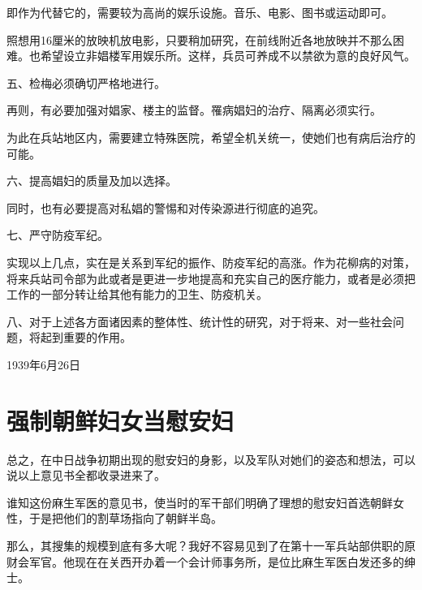 \documentclass[12pt,UTF8]{ctexbook}
\begin{document}
即作为代替它的，需要较为高尚的娱乐设施。音乐、电影、图书或运动即可。



照想用16厘米的放映机放电影，只要稍加研究，在前线附近各地放映并不那么困难。也希望设立非娼楼军用娱乐所。这样，兵员可养成不以禁欲为意的良好风气。



五、检梅必须确切严格地进行。



再则，有必要加强对娼家、楼主的监督。罹病娼妇的治疗、隔离必须实行。



为此在兵站地区内，需要建立特殊医院，希望全机关统一，使她们也有病后治疗的可能。





六、提高娼妇的质量及加以选择。



同时，也有必要提高对私娼的警惕和对传染源进行彻底的追究。



七、严守防疫军纪。



实现以上几点，实在是关系到军纪的振作、防疫军纪的高涨。作为花柳病的对策，将来兵站司令部为此或者是更进一步地提高和充实自己的医疗能力，或者是必须把工作的一部分转让给其他有能力的卫生、防疫机关。



八、对于上述各方面诸因素的整体性、统计性的研究，对于将来、对一些社会问题，将起到重要的作用。



1939年6月26日


\section{强制朝鲜妇女当慰安妇}



总之，在中日战争初期出现的慰安妇的身影，以及军队对她们的姿态和想法，可以说以上意见书全都收录进来了。



谁知这份麻生军医的意见书，使当时的军干部们明确了理想的慰安妇首选朝鲜女性，于是把他们的割草场指向了朝鲜半岛。



那么，其搜集的规模到底有多大呢？我好不容易见到了在第十一军兵站部供职的原财会军官。他现在在关西开办着一个会计师事务所，是位比麻生军医白发还多的绅士。
\end{document}
